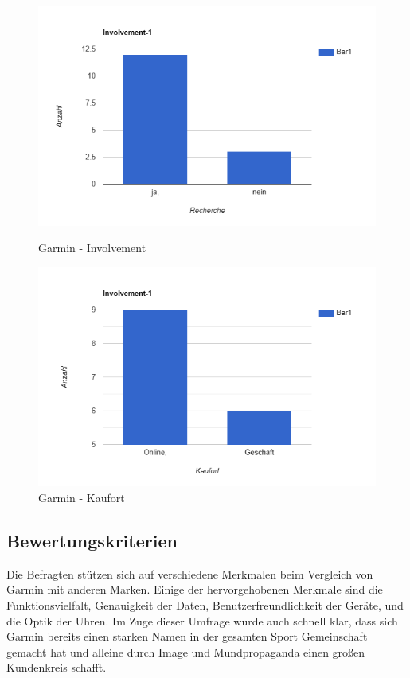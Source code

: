 \begin{figure}[!h]
  \centering
  \begin{minipage}[b]{0.48\textwidth}
    \includegraphics[width=\textwidth]{Figure/involvement-1.png}
      \caption{Garmin - Involvement}
    \label{fig:inv1}
  \end{minipage}
  \hfill
  \begin{minipage}[b]{0.48\textwidth}
    \includegraphics[width=\textwidth]{Figure/involvement-2.png}
    \caption{Garmin - Kaufort}
    \label{fig:inv2}
  \end{minipage}
\end{figure}




\newpage


\subsection{Bewertungskriterien}
Die Befragten stützen sich auf verschiedene Merkmalen beim Vergleich von Garmin mit anderen Marken. Einige der hervorgehobenen Merkmale sind die Funktionsvielfalt, Genauigkeit der Daten, Benutzerfreundlichkeit der Geräte, und die Optik der Uhren. Im Zuge dieser Umfrage wurde auch schnell klar, dass sich Garmin bereits einen starken Namen in der gesamten Sport Gemeinschaft gemacht hat und alleine durch Image und Mundpropaganda einen großen Kundenkreis schafft. 

